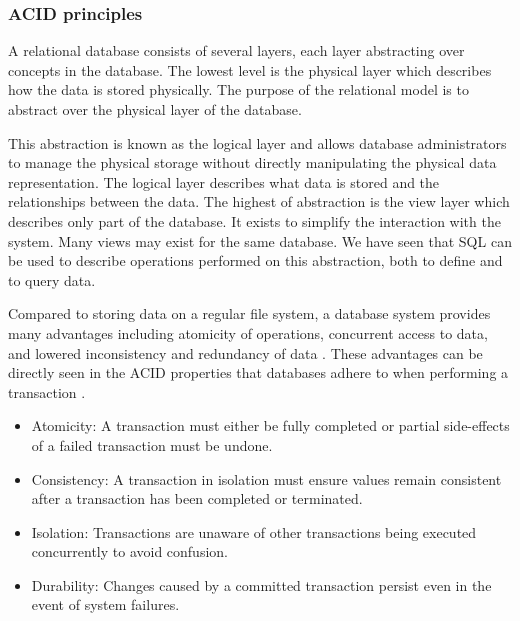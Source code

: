 \subsubsection*{ACID principles}\label{sec:ACID}

A relational database consists of several layers, each layer abstracting over concepts in the database.
The lowest level is the physical layer which describes how the data is stored physically.
The purpose of the relational model is to abstract over the physical layer of the database.

This abstraction is known as the logical layer and allows database administrators to manage the physical storage without directly manipulating the physical data representation.
The logical layer describes what data is stored and the relationships between the data.
The highest of abstraction is the view layer which describes only part of the database.
It exists to simplify the interaction with the system. Many views may exist for the same database.
\cite{DBSBook}
We have seen that SQL can be used to describe operations performed on this abstraction, both to define and to query data.

Compared to storing data on a regular file system, a database system provides many advantages including atomicity of operations, concurrent access to data, and lowered inconsistency and redundancy of data \cite{DBSBook}.
These advantages can be directly seen in the ACID properties that databases adhere to when performing a transaction \cite{DBSBook}.
\begin{itemize} \label{ACID}
    \item Atomicity: A transaction must either be fully completed or partial side-effects of a failed transaction must be undone.
    \item Consistency: A transaction in isolation must ensure values remain consistent after a transaction has been completed or terminated.
    \item Isolation: Transactions are unaware of other transactions being executed concurrently to avoid confusion.
    \item Durability: Changes caused by a committed transaction persist even in the event of system failures.
\end{itemize}

